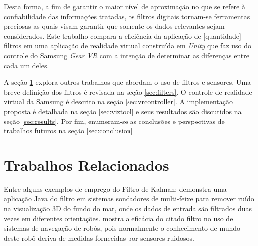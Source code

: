 \documentclass[conference]{IEEEtran}
\begin{document}
Desta forma, a fim de garantir o maior nível de aproximação no que se refere à confiabilidade das informações tratadas, os filtros digitais tornam-se ferramentas preciosas as quais visam garantir que somente os dados relevantes sejam considerados. Este trabalho compara a eficiência da aplicação de [quantidade] filtros em uma aplicação de realidade virtual construída em \textit{Unity} que faz uso do controle do Samsung \textit{Gear VR} com a intenção de determinar as diferenças entre cada um deles.

A seção \ref{sec:relatedworks} explora outros trabalhos que abordam o uso de filtros e sensores. Uma breve definição dos filtros é revisada na seção \ref{sec:filters}. O controle de realidade virtual da Samsung é descrito na seção \ref{sec:vrcontroller}. A implementação proposta é detalhada na seção \ref{sec:viztool} e seus resultados são discutidos na seção \ref{sec:results}. Por fim, enumeram-se as conclusões e perspectivas de trabalhos futuros na seção \ref{sec:conclusion}

\section{Trabalhos Relacionados} \label{sec:relatedworks}

Entre alguns exemplos de emprego do Filtro de Kalman: \cite{demkowiczkalman} demonstra uma aplicação Java do filtro em sistemas sondadores de multi-feixe para remover ruído na visualização 3D do fundo do mar, onde os dados de entrada são filtrados duas vezes em diferentes orientações. \cite{choset2005principles} mostra a eficácia do citado filtro no uso de sistemas de navegação de robôs, pois normalmente o conhecimento de mundo deste robô deriva de medidas fornecidas por sensores ruidosos.
\end{document}
